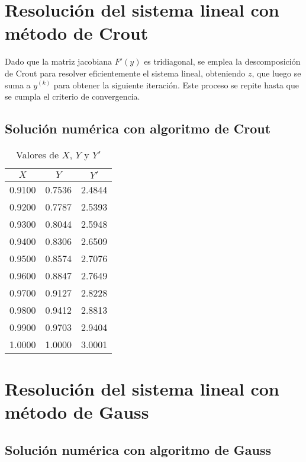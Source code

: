 \documentclass[11pt]{article}
\begin{document}
\section{Resolución del sistema lineal con método de Crout}

Dado que la matriz jacobiana \( F'(y) \) es tridiagonal, se emplea la descomposición de Crout para resolver eficientemente el sistema lineal, obteniendo \( z\), que luego se suma a \( y^{(k)} \) para obtener la siguiente iteración. Este proceso se repite hasta que se cumpla el criterio de convergencia.
\subsection{Solución numérica con algoritmo de Crout}
\begin{table}[H]
\centering
\caption{Valores de \(X\), \(Y\) y \(Y'\)}
\label{tab:datos}
\begin{tabular}{@{}ccc@{}}
\toprule
\(X\)       & \(Y\)       & \(Y'\)      \\ \midrule

0.9100 & 0.7536 & 2.4844 \\
0.9200 & 0.7787 & 2.5393 \\
0.9300 & 0.8044 & 2.5948 \\
0.9400 & 0.8306 & 2.6509 \\
0.9500 & 0.8574 & 2.7076 \\
0.9600 & 0.8847 & 2.7649 \\
0.9700 & 0.9127 & 2.8228 \\
0.9800 & 0.9412 & 2.8813 \\
0.9900 & 0.9703 & 2.9404 \\
1.0000 & 1.0000 & 3.0001 \\ \bottomrule
\end{tabular}
\end{table}
\section{Resolución del sistema lineal con método de Gauss}
\subsection{Solución numérica con algoritmo de Gauss}
\end{document}
